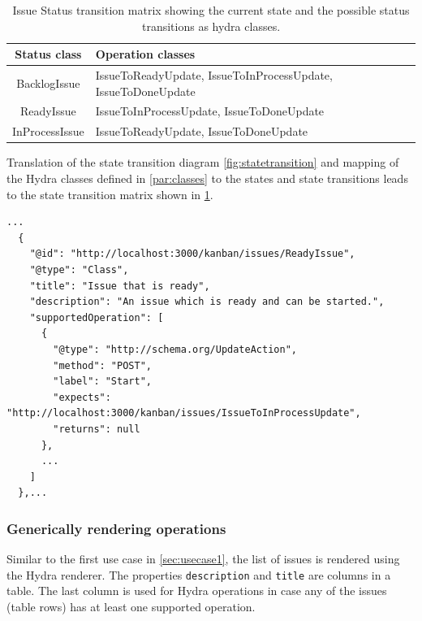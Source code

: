 \begin{table}[!htb]
  \begin{center}
    \begin{tabular}{ |c|l| }
      \hline
      \textbf{Status class} & \textbf{Operation classes} \\
      \hline
      BacklogIssue & IssueToReadyUpdate, IssueToInProcessUpdate, IssueToDoneUpdate \\
      \hline
      ReadyIssue & IssueToInProcessUpdate, IssueToDoneUpdate \\
      \hline
      InProcessIssue & IssueToReadyUpdate, IssueToDoneUpdate \\
      \hline
    \end{tabular}
    \caption{Issue Status transition matrix showing the current state and the possible status transitions as hydra classes.}
    \label{tab:statetransitionmatrix}
  \end{center}
\end{table}

Translation of the state transition diagram \ref{fig:statetransition} and mapping of the Hydra classes defined in \ref{par:classes} to the states and state transitions leads to the state transition matrix shown in \ref{tab:statetransitionmatrix}.

\lstset{language=JSON}
\begin{lstlisting}[caption=Exempt of the Hydra documentation showing the list of supported operations for the issue status class \lstinline{ReadyIssue}.]
  ...
  {
    "@id": "http://localhost:3000/kanban/issues/ReadyIssue",
    "@type": "Class",
    "title": "Issue that is ready",
    "description": "An issue which is ready and can be started.",
    "supportedOperation": [
      {
        "@type": "http://schema.org/UpdateAction",
        "method": "POST",
        "label": "Start",
        "expects": "http://localhost:3000/kanban/issues/IssueToInProcessUpdate",
        "returns": null
      },
      ...
    ]
  },...
\end{lstlisting}

\subsubsection{Generically rendering operations}
Similar to the first use case in \ref{sec:usecase1}, the list of issues is rendered using the Hydra renderer. The properties \lstinline{description} and \lstinline{title} are columns in a table. The last column is used for Hydra operations in case any of the issues (table rows) has at least one supported operation.

